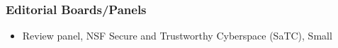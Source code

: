 
\hypertarget{editorial-boards-panels}{%
\subsubsection{Editorial Boards/Panels}\label{editorial-boards-panels}}

\begin{itemize}
\item Review panel, NSF Secure and Trustworthy Cyberspace (SaTC), Small
\end{itemize}
